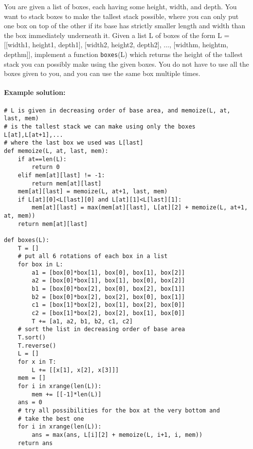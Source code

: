 \documentclass[11pt]{article}
\begin{document}
\medskip

You are given a list of boxes, each having some height, width, and
depth.  You want to stack boxes to make the tallest stack possible,
where you can only put one box on top of the other if its base has
strictly smaller length and width than the box immediately underneath
it.  Given a list L of boxes of the form L = [[width1, height1,
depth1], [width2, height2, depth2], $\ldots$, [widthm, heightm,
depthm]], implement a function \texttt{boxes}(L) which returns the
height of the tallest stack you can possibly make using the given
boxes.  You do not have to use all the boxes given to you, and you can
use the same box multiple times.

\paragraph{Example solution:}
\begin{verbatim}
# L is given in decreasing order of base area, and memoize(L, at, last, mem)
# is the tallest stack we can make using only the boxes L[at],L[at+1],...
# where the last box we used was L[last]
def memoize(L, at, last, mem):
    if at==len(L):
        return 0
    elif mem[at][last] != -1:
        return mem[at][last]
    mem[at][last] = memoize(L, at+1, last, mem)
    if L[at][0]<L[last][0] and L[at][1]<L[last][1]:
        mem[at][last] = max(mem[at][last], L[at][2] + memoize(L, at+1, at, mem))
    return mem[at][last]

def boxes(L):
    T = []
    # put all 6 rotations of each box in a list
    for box in L:
        a1 = [box[0]*box[1], box[0], box[1], box[2]]
        a2 = [box[0]*box[1], box[1], box[0], box[2]]
        b1 = [box[0]*box[2], box[0], box[2], box[1]]
        b2 = [box[0]*box[2], box[2], box[0], box[1]]
        c1 = [box[1]*box[2], box[1], box[2], box[0]]
        c2 = [box[1]*box[2], box[2], box[1], box[0]]
        T += [a1, a2, b1, b2, c1, c2]
    # sort the list in decreasing order of base area
    T.sort()
    T.reverse()
    L = []
    for x in T:
        L += [[x[1], x[2], x[3]]]
    mem = []
    for i in xrange(len(L)):
        mem += [[-1]*len(L)]
    ans = 0
    # try all possibilities for the box at the very bottom and
    # take the best one
    for i in xrange(len(L)):
        ans = max(ans, L[i][2] + memoize(L, i+1, i, mem))
    return ans
\end{verbatim}
\end{document}
